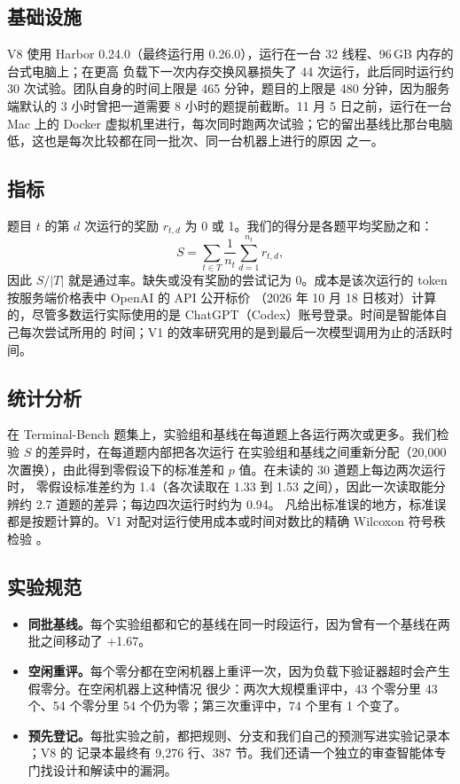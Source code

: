 \subsection{基础设施}

V8 使用 Harbor 0.24.0（最终运行用 0.26.0）\citep{harbor2026}，运行在一台 32 线程、96\,GB 内存的台式电脑上；在更高
负载下一次内存交换风暴损失了 44 次运行，此后同时运行约 30 次试验。团队自身的时间上限是 465 分钟，题目的上限是
480 分钟，因为服务端默认的 3 小时曾把一道需要 8 小时的题提前截断。11 月 5 日之前，运行在一台 Mac 上的 Docker
虚拟机里进行，每次同时跑两次试验；它的留出基线比那台电脑低，这也是每次比较都在同一批次、同一台机器上进行的原因
之一。

\subsection{指标}

题目 $t$ 的第 $d$ 次运行的奖励 $r_{t,d}$ 为 0 或 1。我们的得分是各题平均奖励之和：
\begin{equation}
  S = \sum_{t \in T} \frac{1}{n_t} \sum_{d=1}^{n_t} r_{t,d},
  \label{eq:score}
\end{equation}
因此 $S/|T|$ 就是通过率。缺失或没有奖励的尝试记为 0。成本是该次运行的 token 按服务端价格表中 OpenAI 的 API 公开标价
（2026 年 10 月 18 日核对）计算的，尽管多数运行实际使用的是 ChatGPT（Codex）账号登录。时间是智能体自己每次尝试所用的
时间；V1 的效率研究用的是到最后一次模型调用为止的活跃时间。

\subsection{统计分析}

在 Terminal-Bench 题集上，实验组和基线在每道题上各运行两次或更多。我们检验 $S$ 的差异时，在每道题内部把各次运行
在实验组和基线之间重新分配（20,000 次置换），由此得到零假设下的标准差和 $p$ 值。在未读的 30 道题上每边两次运行时，
零假设标准差约为 1.4（各次读取在 1.33 到 1.53 之间），因此一次读取能分辨约 2.7 道题的差异；每边四次运行时约为 0.94。
凡给出标准误的地方，标准误都是按题计算的。V1 对配对运行使用成本或时间对数比的精确 Wilcoxon 符号秩检验
\citep{wilcoxon1945}。

\subsection{实验规范}

\begin{itemize}[leftmargin=1.4em]
  \item \textbf{同批基线。}每个实验组都和它的基线在同一时段运行，因为曾有一个基线在两批之间移动了 +1.67。
  \item \textbf{空闲重评。}每个零分都在空闲机器上重评一次，因为负载下验证器超时会产生假零分。在空闲机器上这种情况
    很少：两次大规模重评中，43 个零分里 43 个、54 个零分里 54 个仍为零；第三次重评中，74 个里有 1 个变了。
  \item \textbf{预先登记。}每批实验之前，都把规则、分支和我们自己的预测写进实验记录本 \citep{nosek2018prereg}；V8 的
    记录本最终有 9,276 行、387 节。我们还请一个独立的审查智能体专门找设计和解读中的漏洞。
\end{itemize}
